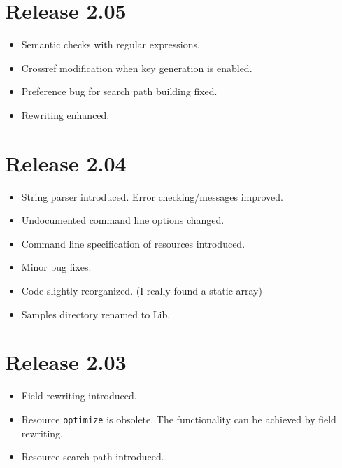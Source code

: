 \documentclass[11pt,a4paper]{scrartcl}
\newcommand\rsc[1]{\texttt{#1}}
\newcommand\File[1]{\textsf{#1}}
\newenvironment{Release}[2]{%
  \def\tmp{#2}%
  \section*{Release #1 \ifx\tmp\empty\else{\normalsize[#2]}\fi}
  \begin{itemize}
}{\end{itemize}}
\newenvironment{Fix}[1]{\item }{}
\newenvironment{New}[1]{\item }{}
\newenvironment{Update}[1]{\item }{}
\begin{document}
\begin{multicols}
 \begin{Release}{2.05}{}
  \begin{New}{gene}
    Semantic checks with regular expressions.
  \end{New}
  \begin{Update}{gene}
    Crossref modification when key generation is enabled.
  \end{Update}
  \begin{Fix}{gene}
    Preference bug for search path building fixed.
  \end{Fix}
  \begin{Update}{gene}
    Rewriting enhanced.
  \end{Update}
 \end{Release}

 \begin{Release}{2.04}{}
  \begin{New}{gene}
    String parser introduced. Error checking/messages improved.
  \end{New}
  \begin{Update}{gene}
    Undocumented command line options changed.
  \end{Update}
  \begin{New}{gene}
    Command line specification of resources introduced.
  \end{New}
  \begin{Fix}{gene}
    Minor bug fixes.
  \end{Fix}
  \begin{Update}{gene}
    Code slightly reorganized. (I really found a static array)
  \end{Update}
  \begin{Update}{gene}
    Samples directory renamed to \File{Lib}.
  \end{Update}
 \end{Release}

 \begin{Release}{2.03}{}
  \begin{New}{gene}
    Field rewriting introduced.
  \end{New}
  \begin{Update}{gene}
    Resource \rsc{optimize} is obsolete. The functionality can
    be achieved by field rewriting.
  \end{Update}
  \begin{New}{gene}
    Resource search path introduced.
  \end{New}
 \end{Release}


\end{multicols}
\end{document}
